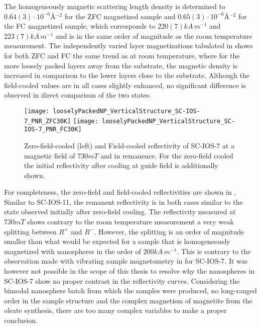 \documentclass[\main/dresen_thesis.tex]{subfiles}
\begin{document}
  The homogeneously magnetic scattering length density is determined to $0.64(3) \cdot \unit{10^{-6} \angstrom^{-2}}$ for the ZFC magnetized sample and $0.65(3) \cdot \unit{10^{-6} \angstrom^{-2}}$ for the FC magnetized sample, which corresponds to $220(7) \unit{kA \, m^{-1}}$ and $223(7) \unit{kA \, m^{-1}}$ and is in the same order of magnitude as the room temperature measurement.
  The independently varied layer magnetizations tabulated in  shows for both ZFC and FC the same trend as at room temperature, where for the more loosely packed layers away from the substrate, the magnetic density is increased in comparison to the lower layers close to the substrate.
  Although the field-cooled values are in all cases slightly enhanced, no significant difference is observed in direct comparison of the two states.

  \begin{figure}[tb]
    \centering
    \texttt{[image: looselyPackedNP\_VerticalStructure\_SC-IOS-7\_PNR\_ZFC30K]}
    \texttt{[image: looselyPackedNP\_VerticalStructure\_SC-IOS-7\_PNR\_FC30K]}
    \caption{\label{fig:looselyPackedNP:layer:ZFCFCIOS7}Zero-field-cooled (left) and Field-cooled reflectivity of SC-IOS-7 at a magnetic field of $730 \unit{mT}$ and in remanence. For the zero-field cooled the initial reflectivity after cooling at guide field is additionally shown.}
  \end{figure}

  For completeness, the zero-field and field-cooled reflectivities are shown in .
  Similar to SC-IOS-11, the remanent reflectivity is in both cases similar to the state observed initially after zero-field cooling.
  The reflectivity measured at $730 \unit{mT}$ shows contrary to the room temperature measurement a very weak splitting between $R^{+}$ and $R^{-}$.
  However, the splitting is an order of magnitude smaller than what would be expected for a sample that is homogeneously magnetized with nanospheres in the order of $200 \unit{kA \, m^{-1}}$.
  This is contrary to the observation made with vibrating sample magnetometry in  for SC-IOS-7.
  It was however not possible in the scope of this thesis to resolve why the nanospheres in SC-IOS-7 show no proper contrast in the reflectivity curves.
  Considering the bimodal nanosphere batch from which the samples were produced, no long-ranged order in the sample structure and the complex magnetism of magnetite from the oleate synthesis, there are too many complex variables to make a proper conclusion.
\end{document}
